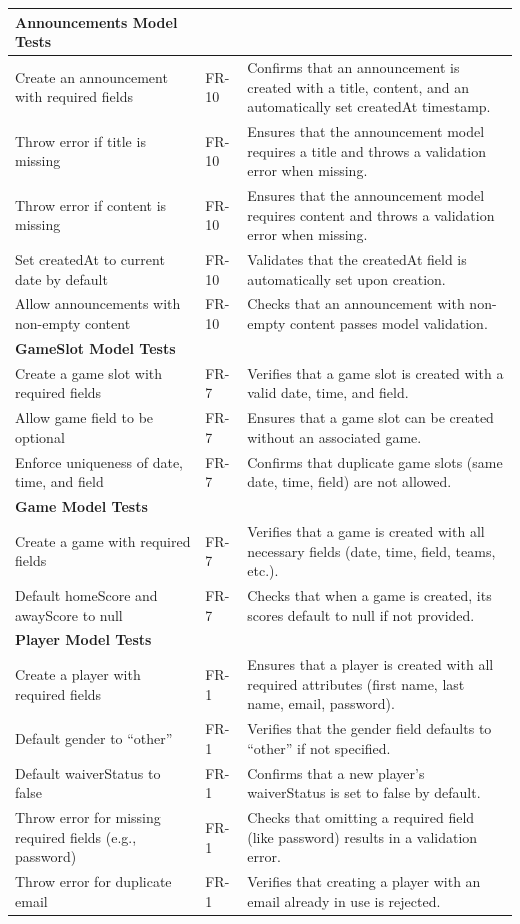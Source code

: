 \documentclass[12pt, titlepage]{article}
\begin{document}
\begin{longtable}{|p{}|p{}|p{}|}
    \textbf{Announcements Model Tests} & & \\ \hline
    Create an announcement with required fields & FR-10 & Confirms that an announcement is created with a title, content, and an automatically set createdAt timestamp. \\ \hline
    Throw error if title is missing & FR-10 & Ensures that the announcement model requires a title and throws a validation error when missing. \\ \hline
    Throw error if content is missing & FR-10 & Ensures that the announcement model requires content and throws a validation error when missing. \\ \hline
    Set createdAt to current date by default & FR-10 & Validates that the createdAt field is automatically set upon creation. \\ \hline
    Allow announcements with non-empty content & FR-10 & Checks that an announcement with non-empty content passes model validation. \\ \hline
    
    \textbf{GameSlot Model Tests} & & \\ \hline
    Create a game slot with required fields & FR-7 & Verifies that a game slot is created with a valid date, time, and field. \\ \hline
    Allow game field to be optional & FR-7 & Ensures that a game slot can be created without an associated game. \\ \hline
    Enforce uniqueness of date, time, and field & FR-7 & Confirms that duplicate game slots (same date, time, field) are not allowed. \\ \hline
    
    \textbf{Game Model Tests} & & \\ \hline
    Create a game with required fields & FR-7 & Verifies that a game is created with all necessary fields (date, time, field, teams, etc.). \\ \hline
    Default homeScore and awayScore to null & FR-7 & Checks that when a game is created, its scores default to null if not provided. \\ \hline
    
    \textbf{Player Model Tests} & & \\ \hline
    Create a player with required fields & FR-1 & Ensures that a player is created with all required attributes (first name, last name, email, password). \\ \hline
    Default gender to ``other'' & FR-1 & Verifies that the gender field defaults to ``other'' if not specified. \\ \hline
    Default waiverStatus to false & FR-1 & Confirms that a new player's waiverStatus is set to false by default. \\ \hline
    Throw error for missing required fields (e.g., password) & FR-1 & Checks that omitting a required field (like password) results in a validation error. \\ \hline
    Throw error for duplicate email & FR-1 & Verifies that creating a player with an email already in use is rejected. \\ \hline
    

\end{longtable}
\end{document}
